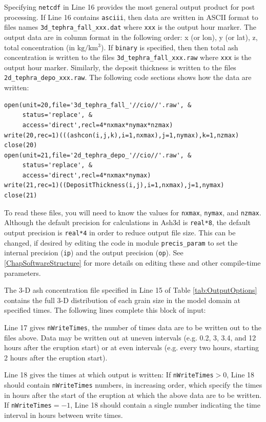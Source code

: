 Specifying \texttt{netcdf} in Line 16 provides the most general output product for post
processing. If Line 16 contains \texttt{asciii}, then data are written in ASCII format
to files names \texttt{3d\_tephra\_fall\_xxx.dat} where \texttt{xxx} is the output hour marker.
The output data are in column format in the following order: x (or lon), y (or lat), z,
total concentration (in $\mathrm{kg/km^3}$).
If \texttt{binary} is specified, then then total ash concentration is written to the files
\texttt{3d\_tephra\_fall\_xxx.raw} where \texttt{xxx} is the output hour marker.
Similarly, the deposit thickness is written to the files \texttt{2d\_tephra\_depo\_xxx.raw}.
The following
code sections shows how the data are written:
\begin{verbatim}
open(unit=20,file='3d_tephra_fall_'//cio//'.raw', &
     status='replace', &
     access='direct',recl=4*nxmax*nymax*nzmax)
write(20,rec=1)(((ashcon(i,j,k),i=1,nxmax),j=1,nymax),k=1,nzmax)
close(20)
open(unit=21,file='2d_tephra_depo_'//cio//'.raw', &
     status='replace', &
     access='direct',recl=4*nxmax*nymax)
write(21,rec=1)((DepositThickness(i,j),i=1,nxmax),j=1,nymax)
close(21)
\end{verbatim}
To read these files, you will need to know the values for \texttt{nxmax},
\texttt{nymax}, and \texttt{nzmax}. Although the default precision for
calculations in Ash3d is \texttt{real*8}, the default output precision is
\texttt{real*4} in order to reduce output file size. This can be changed, if desired
by editing the code in module \texttt{precis\_param} to set the internal
precision (\texttt{ip}) and the output precision (\texttt{op}).
See \ref{ChapSoftwareStructure}
for more details on editing these and other compile-time parameters.

The 3-D ash concentration file specified in Line 15 of Table \ref{tab:OutputOptions}
contains the full
3-D distribution of each grain size in the model domain at specified times.
The following lines complete this block of input:

Line 17 gives \texttt{nWriteTimes}, the number of times data are to be written out to the
files above. Data may be written out at uneven intervals (e.g. 0.2, 3, 3.4, and
12 hours after the eruption start) or at even intervals (e.g. every two hours,
starting 2 hours after the eruption start).

Line 18 gives the times at which output is written:
If \texttt{nWriteTimes}$>0$, Line 18 should contain \texttt{nWriteTimes}
numbers, in increasing order,
which specify the times in hours after the start of the eruption at which the above
data are to be written.
If \texttt{nWriteTimes}$=-1$, Line 18 should contain a single number indicating the time
interval in hours between write times.

